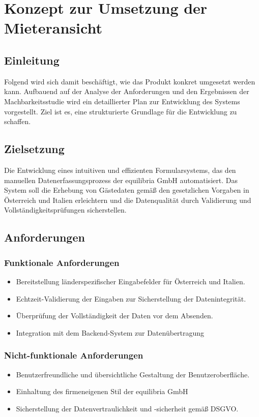 \section{Konzept zur Umsetzung der Mieteransicht}
    \subsection{Einleitung}
    Folgend wird sich damit beschäftigt, wie das Produkt konkret umgesetzt werden kann. Aufbauend auf der Analyse der Anforderungen und den Ergebnissen der Machbarkeitsstudie wird ein detaillierter Plan zur Entwicklung des Systems vorgestellt. Ziel ist es, eine strukturierte Grundlage für die Entwicklung zu schaffen.
    
    \subsection{Zielsetzung}
    Die Entwicklung eines intuitiven und effizienten Formularsystems, das den manuellen Datenerfassungsprozess der equilibria GmbH automatisiert. Das System soll die Erhebung von Gästedaten gemäß den gesetzlichen Vorgaben in Österreich und Italien erleichtern und die Datenqualität durch Validierung und Vollständigkeitsprüfungen sicherstellen.
    
    \subsection{Anforderungen}

        \subsubsection{Funktionale Anforderungen}
        \begin{itemize}
            \item Bereitstellung länderspezifischer Eingabefelder für Österreich und Italien.
            \item Echtzeit-Validierung der Eingaben zur Sicherstellung der Datenintegrität.
            \item Überprüfung der Vollständigkeit der Daten vor dem Absenden.
            \item Integration mit dem Backend-System zur Datenübertragung
        \end{itemize}
        
        \subsubsection{Nicht-funktionale Anforderungen}
        \begin{itemize}
            \item Benutzerfreundliche und übersichtliche Gestaltung der Benutzeroberfläche.
            \item Einhaltung des firmeneigenen Stil der equilibria GmbH
            \item Sicherstellung der Datenvertraulichkeit und -sicherheit gemäß DSGVO.
        \end{itemize}

